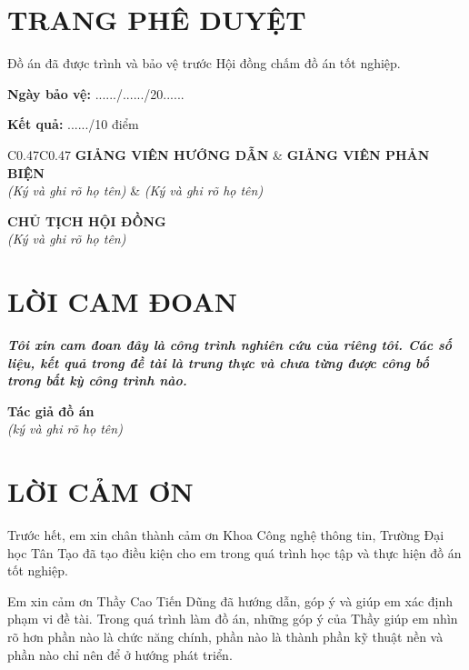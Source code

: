 \documentclass[a4paper]{article}
\begin{document}
\clearpage
\section*{TRANG PHÊ DUYỆT}
Đồ án đã được trình và bảo vệ trước Hội đồng chấm đồ án tốt nghiệp.

\vspace{0.4cm}
\textbf{Ngày bảo vệ:} ....../....../20......

\textbf{Kết quả:} ....../10 điểm

\vspace{2cm}
\noindent
\begin{tabular}{C{0.47\textwidth}C{0.47\textwidth}}
\textbf{GIẢNG VIÊN HƯỚNG DẪN} & \textbf{GIẢNG VIÊN PHẢN BIỆN}\\[0.2cm]
\emph{(Ký và ghi rõ họ tên)} & \emph{(Ký và ghi rõ họ tên)}\\[3cm]
\end{tabular}
\vspace{1cm}
\begin{center}
\textbf{CHỦ TỊCH HỘI ĐỒNG}\\[0.2cm]
\emph{(Ký và ghi rõ họ tên)}
\end{center}

\clearpage
\section*{LỜI CAM ĐOAN}
\textbf{\emph{Tôi xin cam đoan đây là công trình nghiên cứu của riêng tôi. Các số liệu, kết quả trong đề tài là trung thực và chưa từng được công bố trong bất kỳ công trình nào.}}

\begin{flushright}
\textbf{Tác giả đồ án}\\
\emph{(ký và ghi rõ họ tên)}
\end{flushright}

\clearpage
\section*{LỜI CẢM ƠN}
Trước hết, em xin chân thành cảm ơn Khoa Công nghệ thông tin, Trường Đại học Tân Tạo đã tạo điều kiện cho em trong quá trình học tập và thực hiện đồ án tốt nghiệp.

Em xin cảm ơn Thầy Cao Tiến Dũng đã hướng dẫn, góp ý và giúp em xác định phạm vi đề tài. Trong quá trình làm đồ án, những góp ý của Thầy giúp em nhìn rõ hơn phần nào là chức năng chính, phần nào là thành phần kỹ thuật nền và phần nào chỉ nên để ở hướng phát triển.
\end{document}
